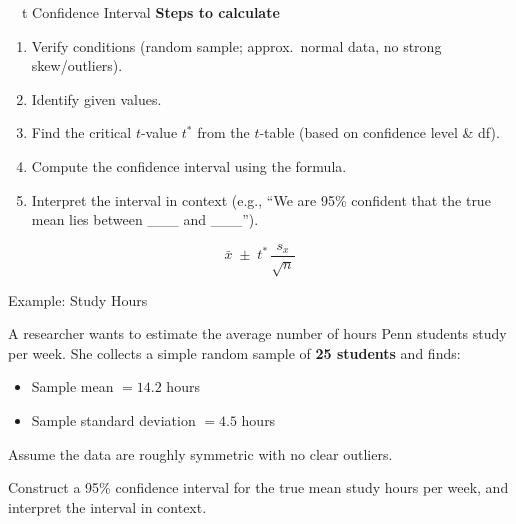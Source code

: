 \documentclass[aspectratio=169,11pt]{beamer}
\begin{document}
\begin{frame}{\ \ t Confidence Interval}
  \textbf{\color{qrnavy}Steps to calculate}
  \begin{enumerate}
    \item Verify conditions (random sample; approx.\ normal data, no strong skew/outliers).
    \item Identify given values.
    \item Find the critical $t$-value $t^*$ from the $t$-table (based on confidence level \& df).
    \item Compute the confidence interval using the formula.
    \item Interpret the interval in context (e.g., ``We are 95\% confident that the true mean lies between \_\_\_ and \_\_\_'').
  \end{enumerate}
  \vspace{0.2em}
  \begin{equation*}
    \bar{x} \;\pm\; t^* \,\frac{s_x}{\sqrt{n}}
  \end{equation*}
\end{frame}

\begin{frame}{Example: Study Hours}
  \begin{keybox}[Scenario]
    A researcher wants to estimate the average number of hours Penn students study
    per week. She collects a simple random sample of \textbf{25 students} and finds:
    \begin{itemize}
      \item Sample mean $= 14.2$ hours
      \item Sample standard deviation $= 4.5$ hours
    \end{itemize}
    Assume the data are roughly symmetric with no clear outliers.
  \end{keybox}
  \vspace{0.5em}
  \begin{center}
    Construct a 95\% confidence interval for the true mean study hours per week,
    and interpret the interval in context.
  \end{center}
\end{frame}
\end{document}
